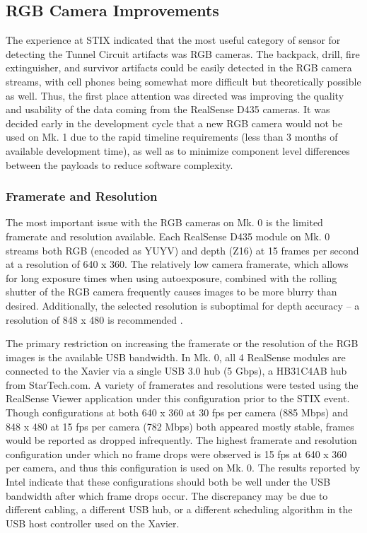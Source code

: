 \subsection{RGB Camera Improvements}

The experience at STIX indicated that the most useful category of sensor for detecting the Tunnel Circuit artifacts was RGB cameras. The backpack, drill, fire extinguisher, and survivor artifacts could be easily detected in the RGB camera streams, with cell phones being somewhat more difficult but theoretically possible as well. Thus, the first place attention was directed was improving the quality and usability of the data coming from the RealSense D435 cameras. It was decided early in the development cycle that a new RGB camera would not be used on Mk. 1 due to the rapid timeline requirements (less than 3 months of available development time), as well as to minimize component level differences between the payloads to reduce software complexity.

\subsubsection{Framerate and Resolution}

The most important issue with the RGB cameras on Mk. 0 is the limited framerate and resolution available. Each RealSense D435 module on Mk. 0 streams both RGB (encoded as YUYV) and depth (Z16) at 15 frames per second at a resolution of 640 x 360. The relatively low camera framerate, which allows for long exposure times when using autoexposure, combined with the rolling shutter of the RGB camera frequently causes images to be more blurry than desired. Additionally, the selected resolution is suboptimal for depth accuracy -- a resolution of 848 x 480 is recommended \cite{depthbestpractices}.

The primary restriction on increasing the framerate or the resolution of the RGB images is the available USB bandwidth. In Mk. 0, all 4 RealSense modules are connected to the Xavier via a single USB 3.0 hub (5 Gbps), a HB31C4AB hub from StarTech.com. A variety of framerates and resolutions were tested using the RealSense Viewer application under this configuration prior to the STIX event. Though configurations at both 640 x 360 at 30 fps per camera (885 Mbps) and 848 x 480 at 15 fps per camera (782 Mbps) both appeared mostly stable, frames would be reported as dropped infrequently. The highest framerate and resolution configuration under which no frame drops were observed is 15 fps at 640 x 360 per camera, and thus this configuration is used on Mk. 0. The results reported by Intel \cite{depthmulticam} indicate that these configurations should both be well under the USB bandwidth after which frame drops occur. The discrepancy may be due to different cabling, a different USB hub, or a different scheduling algorithm in the USB host controller used on the Xavier. 

